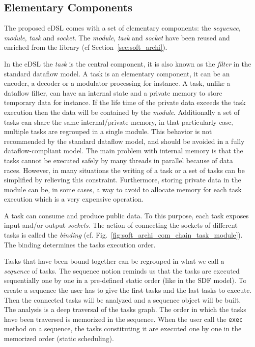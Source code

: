 \subsection{Elementary Components}


The proposed eDSL comes with a set of elementary components: the
\emph{sequence}, \emph{module}, \emph{task} and \emph{socket}. The
\emph{module}, \emph{task} and \emph{socket} have been reused and enriched
from the \AFFECT library (cf Section~\ref{sec:soft_archi}).

In the eDSL the \emph{task} is the central component, it is also known as the
\emph{filter} in the standard dataflow model. A task is an elementary component,
it can be an encoder, a decoder or a modulator processing for instance. A task,
unlike a dataflow filter, can have an internal state and a private memory to
store temporary data for instance. If the life time of the private data exceeds
the task execution then the data will be contained by the \emph{module}.
Additionally a set of tasks can share the same internal/private memory, in that
particularly case, multiple tasks are regrouped in a single module. This
behavior is not recommended by the standard dataflow model, and should be
avoided in a fully dataflow-compliant model. The main problem with internal
memory is that the tasks cannot be executed safely by many threads in parallel
because of data races. However, in many situations the writing of a task or a
set of tasks can be simplified by relieving this constraint. Furthermore,
storing private data in the module can be, in some cases, a way to avoid to
allocate memory for each task execution which is a very expensive operation.

A task can consume and produce public data. To this purpose, each task exposes
input and/or output \emph{sockets}. The action of connecting the sockets of
different tasks is called the \emph{binding} (cf.
Fig.~\ref{fig:soft_archi_com_chain_task_module}).
The binding determines the tasks execution order.

Tasks that have been bound together can be regrouped in what we call a
\emph{sequence} of tasks. The sequence notion reminds us that the tasks are
executed sequentially one by one in a pre-defined static order (like in the SDF
model). To create a sequence the user has to give the first tasks and the
last tasks to execute. Then the connected tasks will be analyzed and a sequence
object will be built. The analysis is a deep traversal of the tasks graph. The
order in which the tasks have been traversed is memorized in the sequence.
When the user call the \verb|exec| method on a sequence, the tasks constituting
it are executed one by one in the memorized order (static scheduling).

